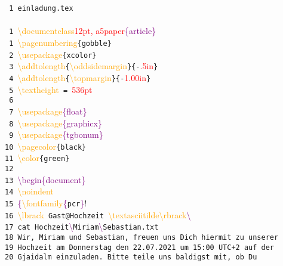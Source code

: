 \documentclass[12pt, a5paper]{article}
\newcommand{\red}[1]{\textcolor{red}{#1}}
\newcommand{\orange}[1]{\textcolor{orange}{#1}}
\newcommand{\purple}[1]{\textcolor{purple}{#1}}
\begin{document}
\noindent
{\selectfont
\verb! 1 einladung.tex!\\ \\
 \verb! 1 !\orange{\textbackslash documentclass}\purple{\lbrack}\red{12pt, a5paper}\purple{\rbrack\{article\}}\\
 \verb! 1 !\orange{\textbackslash pagenumbering}\verb!{gobble}!\\
 \verb! 2 !\orange{\textbackslash usepackage}\verb!{xcolor}!\\
 \verb! 3 !\orange{\textbackslash addtolength}\verb!{!\orange{\textbackslash oddsidemargin}\verb!}{-!\red{.5in}\verb!}!\\
 \verb! 4 !\orange{\textbackslash addtolength}\verb!{!\orange{\textbackslash topmargin}\verb!}{-!\red{1.00in}\verb!}!\\
 \verb! 5 !\orange{\textbackslash textheight}\verb! = !\red{536pt}\\
 \verb! 6!\\
 \verb! 7 !\orange{\textbackslash usepackage}\purple{\{float\}}\\
 \verb! 8 !\orange{\textbackslash usepackage}\purple{\{graphicx\}}\\
 \verb! 9 !\orange{\textbackslash usepackage}\purple{\{tgbonum\}}\\
 \verb!10 !\orange{\textbackslash pagecolor}\verb!{black}!\\
 \verb!11 !\orange{\textbackslash color}\verb!{green}!\\
 \verb!12!\\
 \verb!13 !\purple{\textbackslash begin\{document\}}\\
 \verb!14 !\orange{\textbackslash noindent}\\
 \verb!15 !\purple{\{}\orange{\textbackslash fontfamily}\purple{\{}\verb!pcr!\purple{\}}\selectfont!\\
 \verb!16 !\orange{\textbackslash lbrack}\verb! Gast@Hochzeit !\orange{\textbackslash textasciitilde\textbackslash rbrack}\purple{\textbackslash\textdollar}\\
 \verb!17 cat Hochzeit!\purple{\textbackslash\textunderscore}\verb!Miriam!\purple{\textbackslash\textunderscore}\verb!Sebastian.txt!\\
 \verb!18 Wir, Miriam und Sebastian, freuen uns Dich hiermit zu unserer!\\
 \verb!19 Hochzeit am Donnerstag den 22.07.2021 um 15:00 UTC+2 auf der!\\
 \verb!20 Gjaidalm einzuladen. Bitte teile uns baldigst mit, ob Du!\\
}
\end{document}
